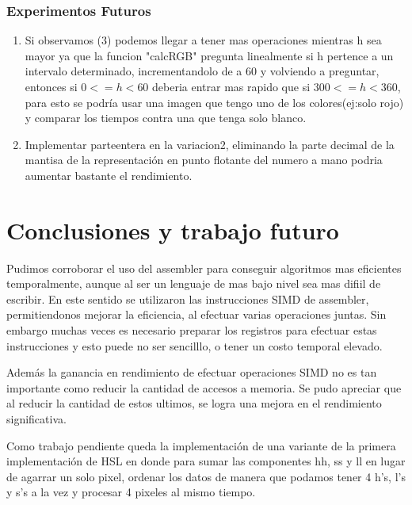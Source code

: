 \documentclass[a4paper]{article}
\begin{document}
\subsubsection{Experimentos Futuros}
\begin{enumerate}
  \item
    Si observamos (3) podemos llegar a tener mas operaciones mientras h sea mayor ya que la funcion "calcRGB" pregunta linealmente si h pertence a un intervalo determinado, incrementandolo de a 60 y volviendo a preguntar, entonces si $0<=h<60$ deberia entrar mas rapido que si $300<=h<360$, para esto se podría usar una imagen que tengo uno de los colores(ej:solo rojo) y comparar los tiempos contra una que tenga solo blanco.

  \item
    Implementar parteentera en la variacion2, eliminando la parte decimal de la mantisa de la representación en punto flotante del numero a mano podria aumentar bastante el rendimiento.
\end{enumerate}

\section{Conclusiones y trabajo futuro}

Pudimos corroborar el uso del assembler para conseguir algoritmos mas eficientes temporalmente, aunque al ser un lenguaje de mas bajo nivel sea mas difiil de escribir. En este sentido se utilizaron las instrucciones SIMD de assembler, permitiendonos mejorar la eficiencia, al efectuar varias operaciones juntas. Sin embargo muchas veces es necesario preparar los registros para efectuar estas instrucciones y esto puede no ser sencilllo, o tener un costo temporal elevado.

Además la ganancia en rendimiento de efectuar operaciones SIMD no es tan importante como reducir la cantidad de accesos a memoria. Se pudo apreciar que al reducir la cantidad de estos ultimos, se logra una mejora en el rendimiento significativa.

Como trabajo pendiente queda la implementación de una variante de la primera implementación de HSL en donde para sumar las componentes hh, ss y ll en lugar de agarrar un solo pixel, ordenar los datos de manera que podamos tener 4 h's, l's y s's a la vez y procesar 4 pixeles al mismo tiempo.
\end{document}
